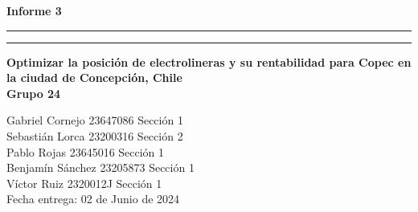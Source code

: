\documentclass[letterpaper]{article}
\begin{document}
\hfill
\vspace*{6cm}
\begin{center}{}
	\vspace*{2mm}
	{\Huge\bf Informe 3}\\
	\vspace*{4mm}
	\hrule\vspace*{1pt}\hrule
	\vspace*{4mm}
	{\LARGE\bf Optimizar la posici\'on de electrolineras y su rentabilidad para Copec en la ciudad de Concepción, Chile}\\
	\vspace*{4mm}
	{\huge\bf Grupo 24 }\\
	\vspace*{1mm}
\end{center}

\vspace*{50mm}
\flushright

Gabriel Cornejo 23647086 Sección 1\\
Sebastián Lorca 23200316 Sección 2\\
Pablo Rojas 23645016 Sección 1\\
Benjamín Sánchez  23205873 Sección 1\\
Víctor Ruiz 2320012J Sección 1\\


\vspace*{5mm}
{\large Fecha entrega: 02 de Junio de 2024\\}

\newpage
\begin{flushleft}
	\tableofcontents
\end{flushleft}
\end{document}
